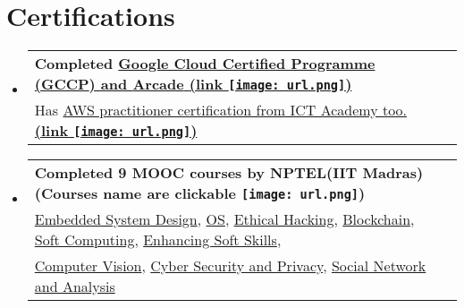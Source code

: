 \documentclass[a4paper,11pt]{article}
\makeatletter
\newcommand{\resumePOR}[3]{
\vspace{0.5mm}\item
    \begin{tabular*}{0.97\textwidth}[t]{l@{\extracolsep{\fill}}r}
        \textbf{#1}\hspace{0.3mm}#2 & \textit{\small{#3}} 
    \end{tabular*}
    \vspace{-2mm}
}
\newcommand{\resumeSubHeadingListStart}{\begin{itemize}[leftmargin=*,labelsep=0mm]}
\newcommand{\resumeSubHeadingListEnd}{\end{itemize}\vspace{2mm}}
\newcommand{\customtext}[1]{{\sffamily\bfseries #1}}
\makeatother
\begin{document}
\section{\textbf{Certifications}}
\vspace{-0.4mm}
\resumeSubHeadingListStart
\resumePOR{ Completed \href{https://www.cloudskillsboost.google/public_profiles/91489762-1602-483b-ab67-1b39c37ef97e}{Google Cloud Certified Programme ({\customtext{\textbf{\textcolor{sand}{GCCP}}}}) and {\customtext{\textbf{\textcolor{sand}{Arcade}}}} {\color{gray}\textbf{(link \texttt{[image: url.png]})}}}} %
    {\\ \thinspace \thinspace \thinspace Has \href{https://drive.google.com/file/d/1W1SGN5S8B5xBssxEpR7Hf7R4qthaMAJq/view}{AWS practitioner certification from ICT Academy too. {\color{gray}\textbf{(link \texttt{[image: url.png]})}}}} %
    {} %

\vspace{-1.5mm}
\resumePOR{ Completed {\customtext{\textbf{\textcolor{sand}{9 MOOC}}}} courses by {\customtext{\textbf{\textcolor{sand}{NPTEL}}}}(IIT Madras){\color{gray}\textbf{(Courses name are clickable \texttt{[image: url.png]})}}} %
    {\\ \thinspace \thinspace \href{https://archive.nptel.ac.in/noc/Ecertificate/?q=NPTEL22CS93S1324053909029523}{Embedded System Design}, \href{https://archive.nptel.ac.in/noc/Ecertificate/?q=NPTEL22CS78S2324114009029523}{OS}, \href{https://archive.nptel.ac.in/noc/Ecertificate/?q=NPTEL23CS44S2344088504100972}{Ethical Hacking}, \href{https://archive.nptel.ac.in/noc/Ecertificate/?q=NPTEL23CS47S3344132104100972}{Blockchain}, \href{https://archive.nptel.ac.in/noc/Ecertificate/?q=NPTEL23CS40S4442171903039511}{Soft Computing}, 
	\href{https://archive.nptel.ac.in/noc/Ecertificate/?q=NPTEL23HS30S4344245804100972}{Enhancing Soft Skills},
	\\ \thinspace \thinspace \href{https://archive.nptel.ac.in/content/noc/NOC24/SEM1/Ecertificates/108/noc24-ee38/Course/NPTEL24EE38S45430276730459110.pdf}{Computer Vision}, \href{https://archive.nptel.ac.in/content/noc/NOC23/SEM2/Ecertificates/106/noc23-cs127/Course/NPTEL23CS127S63430921520146520.pdf}{Cyber Security and Privacy}, \href{https://archive.nptel.ac.in/content/noc/NOC23/SEM2/Ecertificates/106/noc23-cs106/Course/NPTEL23CS106S53430894920146520.pdf}{Social Network and Analysis}} %
    {} %
\resumeSubHeadingListEnd
\vspace{-10.5mm}


\end{document}
